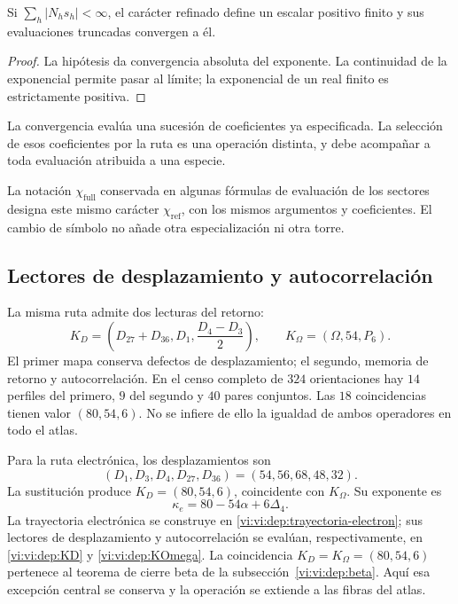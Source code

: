 \begin{proposition}
Si \(\sum_h|N_hs_h|<\infty\), el carácter refinado define un escalar
positivo finito y sus evaluaciones truncadas convergen a él.
\end{proposition}
\begin{proof}
La hipótesis da convergencia absoluta del exponente. La continuidad de la
exponencial permite pasar al límite; la exponencial de un real finito es
estrictamente positiva.
\end{proof}

La convergencia evalúa una sucesión de coeficientes ya especificada.
La selección de esos coeficientes por la ruta es una operación distinta,
y debe acompañar a toda evaluación atribuida a una especie.

La notación \(\chi_{\mathrm{full}}\) conservada en algunas fórmulas
de evaluación de los sectores designa este mismo carácter
\(\chi_{\mathrm{ref}}\), con los mismos argumentos y coeficientes.
El cambio de símbolo no añade otra especialización ni otra torre.

\subsection{Lectores de desplazamiento y autocorrelación}

La misma ruta admite dos lecturas del retorno:
\[
 K_D=\left(D_{27}+D_{36},D_1,\frac{D_4-D_3}{2}\right),\qquad
 K_\Omega=(\Omega,54,P_6).
\]
El primer mapa conserva defectos de desplazamiento; el segundo, memoria de
retorno y autocorrelación. En el censo completo de \(324\) orientaciones
hay \(14\) perfiles del primero, \(9\) del segundo y \(40\) pares
conjuntos. Las \(18\) coincidencias tienen valor \((80,54,6)\).
No se infiere de ello la igualdad de ambos operadores en todo el atlas.

Para la ruta electrónica, los desplazamientos son
\[
 (D_1,D_3,D_4,D_{27},D_{36})=(54,56,68,48,32).
\]
La sustitución produce \(K_D=(80,54,6)\), coincidente con
\(K_\Omega\). Su exponente es
\[
 \kappa_e=80-54\alpha+6\Delta_4.
\]
La trayectoria electrónica se construye en
\eqref{vi:vi:dep:trayectoria-electron}; sus lectores de desplazamiento y
autocorrelación se evalúan, respectivamente, en
\eqref{vi:vi:dep:KD} y \eqref{vi:vi:dep:KOmega}. La coincidencia
\(K_D=K_\Omega=(80,54,6)\) pertenece al teorema de cierre beta de la
subsección~\ref{vi:vi:dep:beta}. Aquí esa excepción central se conserva y la
operación se extiende a las fibras del atlas.

